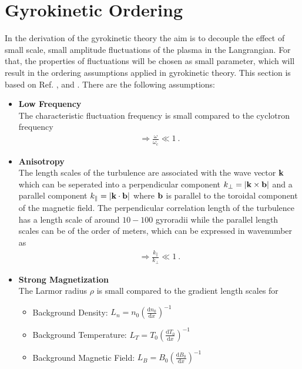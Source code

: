 \section{Gyrokinetic Ordering}
\label{sec:gyroordering}

In the derivation of the gyrokinetic theory the aim is to decouple the effect of small scale, small amplitude fluctuations of the plasma in the Langrangian. For that, the properties of fluctuations will be chosen as small parameter, which will result in the ordering assumptions applied in gyrokinetic theory. This section is based on Ref.  ,  and . There are the following assumptions:

\begin{itemize}
	\item \textbf{Low Frequency}\\
		The characteristic fluctuation frequency is small compared to the cyclotron frequency 
		\begin{gather*}
			\Rightarrow \frac{\omega}{\omega_\mathrm{c}} \ll 1~.
		\end{gather*}
	\item \textbf{Anisotropy}\\
		The length scales of the turbulence are associated with the wave vector $\boldsymbol{\mathbf{k}}$ which can be seperated into a perpendicular component $k_\perp = |\boldsymbol{\mathbf{k}} \times \boldsymbol{\mathbf{b}}|$ and a parallel component $k_\parallel = |\boldsymbol{\mathbf{k}} \cdot \boldsymbol{\mathbf{b}}|$ where $\boldsymbol{\mathbf{b}}$ is parallel to the toroidal component of the magnetic field. The perpendicular correlation length of the turbulence has a length scale of around $10 - 100$ gyroradii while the parallel length scales can be of the order of meters, which can be expressed in wavenumber as
		\begin{gather*}
			\Rightarrow \frac{k_\parallel}{k_\perp} \ll 1~.
		\end{gather*}
	\item \textbf{Strong Magnetization}\\
		The Larmor radius $\rho$ is small compared to the gradient length scales for
		\begin{itemize}
			\item Background Density: $L_n = n_0 \left(\frac{\mathrm{d}n_0}{\mathrm{d}x}\right)^{-1}$
			\item Background Temperature: $L_T = T_0 \left(\frac{\mathrm{d}T_0}{\mathrm{d}x}\right)^{-1}$
			\item Background Magnetic Field: $L_B = B_0 \left(\frac{\mathrm{d}B_0}{\mathrm{d}x}\right)^{-1}$

\end{itemize}
\end{itemize}
